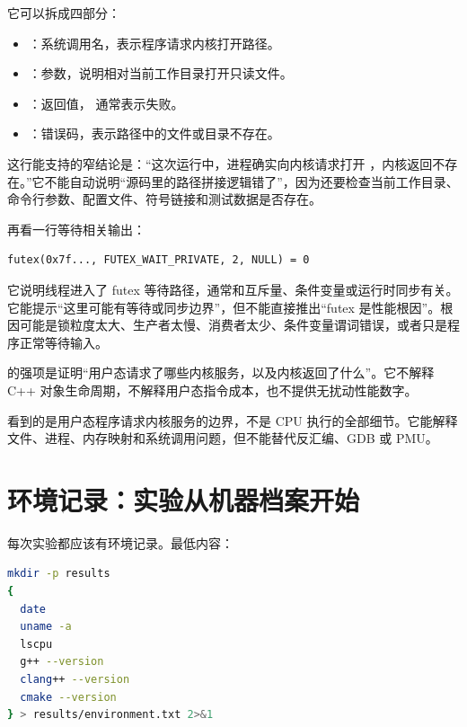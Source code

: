 它可以拆成四部分：

\begin{itemize}
  \item {}：系统调用名，表示程序请求内核打开路径。
  \item {}：参数，说明相对当前工作目录打开只读文件。
  \item {}：返回值， 通常表示失败。
  \item {}：错误码，表示路径中的文件或目录不存在。
\end{itemize}

这行能支持的窄结论是：“这次运行中，进程确实向内核请求打开 ，内核返回不存在。”它不能自动说明“源码里的路径拼接逻辑错了”，因为还要检查当前工作目录、命令行参数、配置文件、符号链接和测试数据是否存在。

再看一行等待相关输出：

\begin{lstlisting}[numbers=none,caption={线程等待相关的 futex 调用}]
futex(0x7f..., FUTEX_WAIT_PRIVATE, 2, NULL) = 0
\end{lstlisting}

它说明线程进入了 futex 等待路径，通常和互斥量、条件变量或运行时同步有关。它能提示“这里可能有等待或同步边界”，但不能直接推出“futex 是性能根因”。根因可能是锁粒度太大、生产者太慢、消费者太少、条件变量谓词错误，或者只是程序正常等待输入。

\begin{keyidea}
 的强项是证明“用户态请求了哪些内核服务，以及内核返回了什么”。它不解释 C++ 对象生命周期，不解释用户态指令成本，也不提供无扰动性能数字。
\end{keyidea}

\begin{warningbox}
 看到的是用户态程序请求内核服务的边界，不是 CPU 执行的全部细节。它能解释文件、进程、内存映射和系统调用问题，但不能替代反汇编、GDB 或 PMU。
\end{warningbox}

\section{环境记录：实验从机器档案开始}

每次实验都应该有环境记录。最低内容：

\begin{lstlisting}[language=bash]
mkdir -p results
{
  date
  uname -a
  lscpu
  g++ --version
  clang++ --version
  cmake --version
} > results/environment.txt 2>&1
\end{lstlisting}

